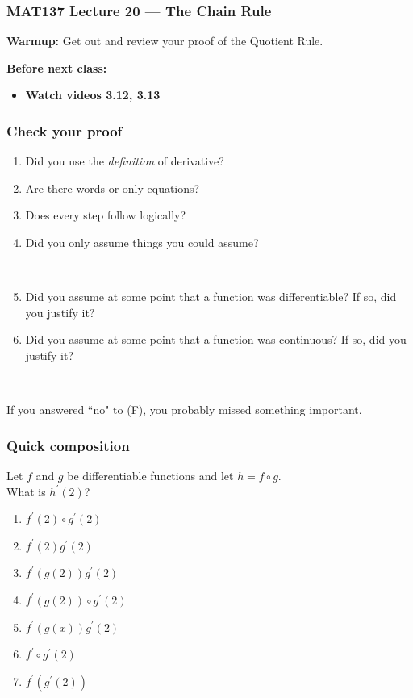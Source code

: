 \documentclass[14pt]{beamer}
\begin{document}
\begin{frame}
	\frametitle{MAT137 Lecture 20 --- The Chain Rule}

	{\bf Warmup:} Get out and review your proof of the Quotient Rule.

	\vfill
	{\bf Before next class:}
		\begin{itemize} \normalsize
			\item {\bf Watch videos 3.12, 3.13 }
		\end{itemize}
\end{frame}


\begin{frame}[t]
\frametitle{Check your proof}

\begin{enumerate}
	\item Did you use the \emph{definition} of derivative?
	\item  Are there words or only equations?
	\item  Does every step follow logically?
	\item  Did you only assume things you could assume?
	
	\
	
	\item  Did you assume at some point that a function was differentiable?  If so, did you justify it?

	\item \label{qu:cont} Did you assume at some point that a function was continuous?  If so, did you justify it?
	
\end{enumerate}

\

	If you answered ``no" to (F), you probably missed something important.

\end{frame}



\begin{frame}
\frametitle{Quick composition}

 Let $f$ and $g$ be differentiable functions and let $h=f\circ g$. \\ What is $h^{\prime}(2)$?

 \vfill

\begin {enumerate}
\item $f^{\prime}(2)\circ g^{\prime}(2)$
\item $f^{\prime}(2)g^{\prime}(2)$
\item $f^{\prime}(g(2)) g^{\prime}(2)$
\item $f^{\prime}(g(2))\circ g^{\prime}(2)$
\item $f^{\prime}(g(x)) g^{\prime}(2)$
\item $f^{\prime}\circ g^{\prime}(2)$
\item $f^{\prime}(g^{\prime}(2))$
\end{enumerate}

\end{frame}
\end{document}

